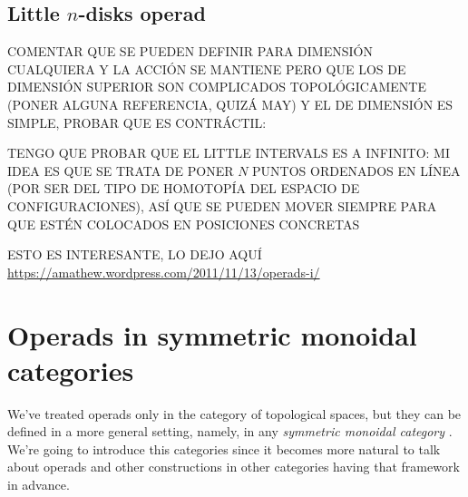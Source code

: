 \documentclass[TFM.tex]{subfiles}
\begin{document}
\subsection{Little $n$-disks operad}\label{intervals}
COMENTAR QUE SE PUEDEN DEFINIR PARA DIMENSIÓN CUALQUIERA Y LA ACCIÓN SE MANTIENE PERO QUE LOS DE DIMENSIÓN SUPERIOR SON COMPLICADOS TOPOLÓGICAMENTE (PONER ALGUNA REFERENCIA, QUIZÁ MAY) Y EL DE DIMENSIÓN ES SIMPLE, PROBAR QUE ES CONTRÁCTIL:

TENGO QUE PROBAR QUE EL LITTLE INTERVALS ES A INFINITO: MI IDEA ES QUE SE TRATA DE PONER $N$ PUNTOS ORDENADOS EN LÍNEA (POR SER DEL TIPO DE HOMOTOPÍA DEL ESPACIO DE CONFIGURACIONES), ASÍ QUE SE PUEDEN MOVER SIEMPRE PARA QUE ESTÉN COLOCADOS EN POSICIONES CONCRETAS


ESTO ES INTERESANTE, LO DEJO AQUÍ \url{https://amathew.wordpress.com/2011/11/13/operads-i/}

\section{Operads in symmetric monoidal categories}
We've treated operads only in the category of topological spaces, but they can be defined in a more general setting, namely, in any \emph{symmetric monoidal category} \cite{Yau}. We're going to introduce this categories since it becomes more natural to talk about operads and other constructions in other categories having that framework in advance.
\end{document}
